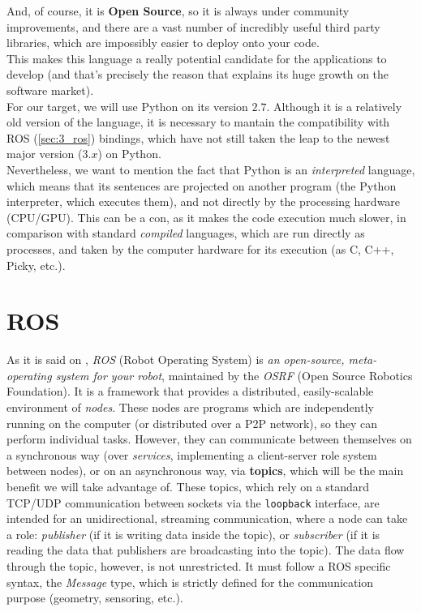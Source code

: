 	And, of course, it is \textbf{Open Source}, so it is always under community improvements, and there are a vast number of incredibly useful third party libraries, which are impossibly easier to deploy onto your code.\\
	
	This makes this language a really potential candidate for the applications to develop (and that's precisely the reason that explains its huge growth on the software market).\\
	
	For our target, we will use Python on its version $2.7$. Although it is a relatively old version of the language, it is necessary to mantain the compatibility with ROS (\autoref{sec:3_ros}) bindings, which have not still taken the leap to the newest major version ($3.x$) on Python.\\
	
	Nevertheless, we want to mention the fact that Python is an \emph{interpreted} language, which means that its sentences are projected on another program (the Python interpreter, which executes them), and not directly by the processing hardware (CPU/GPU). This can be a con, as it makes the code execution much slower, in comparison with standard \emph{compiled} languages, which are run directly as processes, and taken by the computer hardware for its execution (as C, C++, Picky, etc.).

\section{ROS}
	\label{sec:3_ros}
	As it is said on \cite{ros-intro}, \emph{ROS} (Robot Operating System) is \textit{an open-source, meta-operating system for your robot}, maintained by the \emph{OSRF} (Open Source Robotics Foundation). It is a framework that provides a distributed, easily-scalable environment of \emph{nodes}. These nodes are programs which are independently running on the computer (or distributed over a P2P network), so they can perform individual tasks. However, they can communicate between themselves on a synchronous way (over \emph{services}, implementing a client-server role system between nodes), or on an asynchronous way, via \textbf{topics}, which will be the main benefit we will take advantage of. These topics, which rely on a standard TCP/UDP communication between sockets via the \texttt{loopback} interface, are intended for an unidirectional, streaming communication, where a node can take a role: \emph{publisher} (if it is writing data inside the topic), or \emph{subscriber} (if it is reading the data that publishers are broadcasting into the topic). The data flow through the topic, however, is not unrestricted. It must follow a ROS specific syntax, the \emph{Message} type, which is strictly defined for the communication purpose (geometry, sensoring, etc.).\\
	
